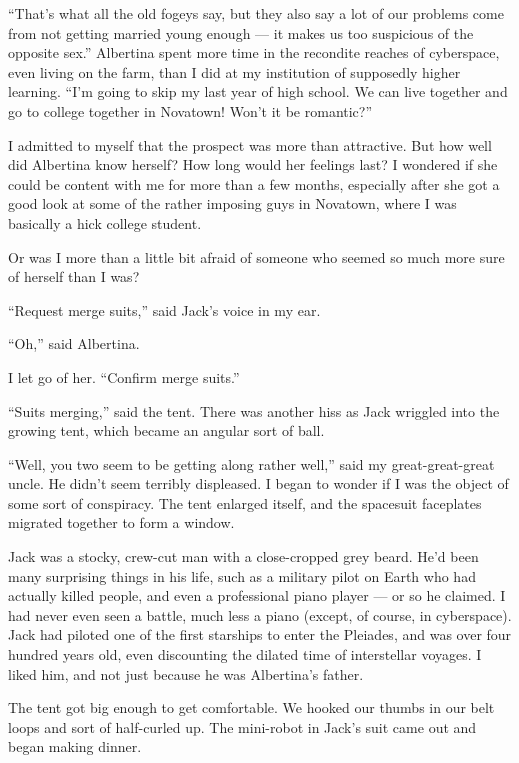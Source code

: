\documentclass[english,11pt,letterpaper,onecolumn]{scrbook}
\begin{document}
	``That's what all the old fogeys say, but they also say a lot of our problems come from not getting married young enough --- it makes us too suspicious of the opposite sex.''  Albertina spent more time in the recondite reaches of cyberspace, even living on the farm, than I did at my institution of supposedly higher learning.  ``I'm going to skip my last year of high school.  We can live together and go to college together in Novatown!  Won't it be romantic?''

	I admitted to myself that the prospect was more than attractive.  But how well did Albertina know herself?  How long would her feelings last?  I wondered if she could be content with me for more than a few months, especially after she got a good look at some of the rather imposing guys in Novatown, where I was basically a hick college student.

	Or was I more than a little bit afraid of someone who seemed so much more sure of herself than I was?

	``Request merge suits,'' said Jack's voice in my ear.

	``Oh,'' said Albertina.

	I let go of her. ``Confirm merge suits.''

	``Suits merging,'' said the tent.  There was another hiss as Jack wriggled into the growing tent, which became an angular sort of ball.

	``Well, you two seem to be getting along rather well,'' said my great-great-great uncle.  He didn't seem terribly displeased.  I began to wonder if I was the object of some sort of conspiracy.  The tent enlarged itself, and the spacesuit faceplates migrated together to form a window.  

	Jack was a stocky, crew-cut man with a close-cropped grey beard.  He'd been many surprising things in his life, such as a military pilot on Earth who had actually killed people, and even a professional piano player --- or so he claimed.  I had never even seen a battle, much less a piano (except, of course, in cyberspace).  Jack had piloted one of the first starships to enter the Pleiades, and was over four hundred years old, even discounting the dilated time of interstellar voyages.  I liked him, and not just because he was Albertina's father.

	The tent got big enough to get comfortable.  We hooked our thumbs in our belt loops and sort of half-curled up.  The mini-robot in Jack's suit came out and began making dinner.
\end{document}
